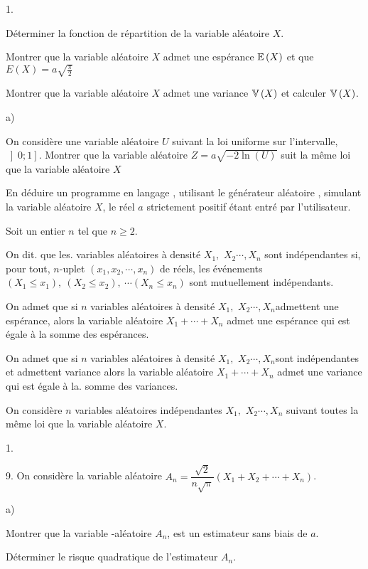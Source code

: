 \documentclass[11pt]{article}%
\begin{document}
\begin{noliste}{1.}
\item Déterminer la fonction de répartition de la variable
aléatoire $X$.

\item Montrer que la variable aléatoire $X$ admet une espérance
$\mathbb{E}\left( X\right) $ et que $ E\left( X\right) = a\sqrt
{\frac{\pi}{2}}$

\item Montrer que la variable aléatoire $X$ admet une variance
$\mathbb{V}\left(
X\right) $ et calculer $\mathbb{V}\left( X\right) $.

\item
\begin{noliste}{a)}
 \setlength{\itemsep}{2mm}
\item On considère une variable aléatoire $U$ suivant la loi uniforme
sur l'intervalle, $\left] 0;1\right] $. Montrer que la variable
aléatoire $Z = a\sqrt{-2\ln\left( U\right) }$ suit la même loi que la
variable aléatoire $X$

\item En déduire un programme en langage \Scilab{}, utilisant le
générateur aléatoire \Scilab{}, simulant la variable aléatoire
$X$, le réel $a$ strictement positif étant entré par l'utilisateur.
\end{noliste}
\end{noliste}

Soit un entier $n$ tel que $n\geq2.$

On dit. que les. variables aléatoires à densité $X_{1},$
$X_{2}\cdots,X_{n}$ sont indépendantes si, pour tout, $n$-uplet $\left(
x_{1},x_{2},\cdots,x_{n}\right) $ de réels, les événements
$\left( X_{1}\leq x_{1}\right),\ \left( X_{2}\leq x_{2}\right),\
\cdots\left( X_{n}\leq x_{n}\right) $ sont mutuellement indépendants.

On admet que si $n$ variables aléatoires à densité $X_{1},$
$X_{2}\cdots,X_{n}$admettent une espérance, alors la variable
aléatoire $X_{1} + \cdots + X_{n}$ admet une espérance qui est égale
à la somme des espérances.

On admet que si $n$ variables aléatoires à densité $X_{1},$
$X_{2}\cdots,X_{n}$sont indépendantes et admettent variance alors la
variable aléatoire $X_{1} + \cdots + X_{n}$ admet une variance qui est
égale à la. somme des variances.

On considère $n$ variables aléatoires indépendantes $X_{1},$
$X_{2}\cdots,X_{n}$ suivant toutes la même loi que la variable
aléatoire $X$.

\begin{noliste}{1.}
 \setlength{\itemsep}{4mm}
\item[9.] On considère la variable aléatoire $A_{n} =
\dfrac{\sqrt{2}}{n\sqrt{\pi}}\left( X_{1} + X_{2} + \cdots +
X_{n}\right) $.

\begin{noliste}{a)}
 \setlength{\itemsep}{2mm}
\item Montrer que la variable -aléatoire $A_{n}$, est un estimateur
sans
biais de $a$.

\item Déterminer le risque quadratique de l'estimateur $A_{n}$.
\end{noliste}
\end{noliste}
\end{document}
